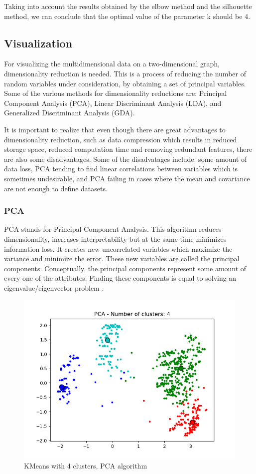 \documentclass[times, utf8, zavrsni, numeric]{fer}
\begin{document}
Taking into account the results obtained by the elbow method and the silhouette method, 
we can conclude that the optimal value of the parameter k should be 4. 

\subsection{Visualization}
For visualizing the multidimensional data on a two-dimensional graph, dimensionality reduction 
is needed. This is a process of reducing  the number of random variables under consideration, 
by obtaining a set of principal variables. Some of the various methods for dimensionality 
reductions are: Principal Component Analysis (PCA), Linear Discriminant Analysis (LDA), 
and Generalized Discriminant Analysis (GDA).

It is important to realize that even though there are great advantages to dimensionality reduction, 
such as data compression which results in reduced storage space, reduced computation time and 
removing redundant features, there are also some disadvantages. Some of the disadvatages include: some amount of data loss, 
PCA tending to find linear correlations between variables which is sometimes undesirable, and
PCA failing in cases where the mean and covariance are not enough to define datasets.

\subsubsection{PCA}
PCA stands for Principal Component Analysis. This algorithm reduces dimensionality, 
increases interpretability but at the same time minimizes information loss. It creates 
new uncorrelated variables which maximize the variance and minimize the error. These new 
variables are called the principal components. Conceptually, the principal components
represent some amount of every one of the attributes. Finding these components is 
equal to solving an eigenvalue/eigenvector problem \cite{pca}.

\begin{figure}[H]
    \centering
    \includegraphics[width=\linewidth]{figures/4_clusters.png}
    \caption{KMeans with 4 clusters, PCA algorithm}
    \label{fig:4pca}
\end{figure}
\end{document}

